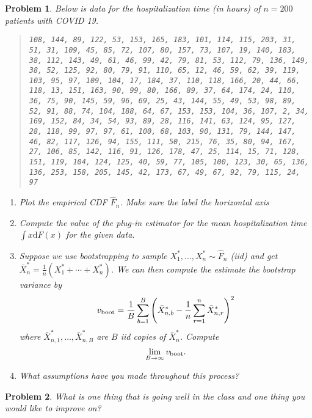 \documentclass{article}
\newtheorem{problem}{Problem}
\renewcommand{\d}{\mathrm{d}}
\begin{document}
\clearpage
\begin{problem}

Below is data for the hospitalization time (in hours) of $n=200$ patients with COVID 19.
    \begin{quote}
    \texttt{108, 144, 89, 122, 53, 153, 165, 183, 101, 114, 115, 203, 31, 51, 31, 109, 45, 85, 72, 107, 80, 157,  73, 107, 19, 140, 183, 38, 112, 143, 49, 61, 46,  99, 42, 79, 81, 53, 112, 79, 136, 149, 38, 52, 125, 92, 80, 79, 91, 110, 65, 12, 46, 59, 62,  39, 119, 103, 95, 97, 109, 104, 17, 184, 37, 110, 118, 166, 20, 44, 66, 118, 13, 151, 163, 90, 99,  80, 166, 89, 37, 64, 174, 24, 110, 36, 75, 90, 145, 59, 96, 69, 25, 43, 144, 55, 49, 53, 98,  89, 52, 91, 88, 74, 104, 188, 64, 67, 153, 153, 104, 36, 107,  2, 34, 169, 152, 84, 34, 54, 93,  89, 28, 116, 141, 63, 124, 95, 127, 28, 118, 99,  97, 97, 61, 100, 68, 103, 90, 131, 79, 144, 147,  46, 82, 117, 126, 94, 155, 111, 50, 215, 76, 35,  80, 94, 167, 27, 106, 85, 142, 116, 91, 126, 178,  47, 25, 114, 15, 71, 128, 151, 119, 104, 124, 125,  40, 59, 77, 105, 100, 123, 30, 65, 136, 136, 253, 158, 205, 145, 42, 173, 67, 49, 67, 92, 79, 115,  24, 97}
    \end{quote}

    \begin{enumerate}[label=(\alph*),topsep=0pt]
        \item Plot the empirical CDF $\hat{F}_n$. Make sure the label the horizontal axis
        \item Compute the value of the plug-in estimator for the mean hospitalization time $\int x\d F(x)$ for the given data.

        \item Suppose we use bootstrapping to sample $X_1^*, \ldots, X_n^*\sim \hat{F}_n$ (iid) and get $\bar{X}_n^* = \frac{1}{n}(X_1^* + \cdots + X_n^*)$.
            We can then compute the estimate the bootstrap variance by
            \begin{equation*}
                v_{\textup{boot}} = \frac{1}{B} \sum_{b=1}^{B} \left( \bar{X}_{n,b}^* - \frac{1}{n} \sum_{r=1}^{n} \bar{X}_{n,r}^* \right)^2
            \end{equation*}
            where $\bar{X}_{n,1}^*, \ldots, \bar{X}_{n,B}^*$ are $B$ iid copies of $\bar{X}_n^*$.
            Compute
            \begin{equation*}
                \lim_{B\to\infty} v_{\textup{boot}}.
            \end{equation*}


        \item What assumptions have you made throughout this process?
    \end{enumerate}
\end{problem}

\begin{problem}
    What is one thing that is going well in the class and one thing you would like to improve on?
\end{problem}
\end{document}
